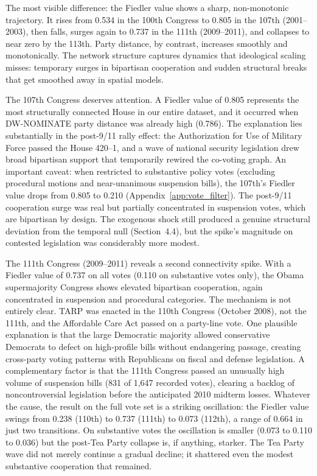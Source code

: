 \documentclass[12pt, a4paper]{article}
\begin{document}
The most visible difference: the Fiedler value shows a sharp, non-monotonic trajectory. It rises from 0.534 in the 100th Congress to 0.805 in the 107th (2001--2003), then falls, surges again to 0.737 in the 111th (2009--2011), and collapses to near zero by the 113th. Party distance, by contrast, increases smoothly and monotonically. The network structure captures dynamics that ideological scaling misses: temporary surges in bipartisan cooperation and sudden structural breaks that get smoothed away in spatial models.

The 107th Congress deserves attention. A Fiedler value of 0.805 represents the most structurally connected House in our entire dataset, and it occurred when DW-NOMINATE party distance was already high (0.786). The explanation lies substantially in the post-9/11 rally effect: the Authorization for Use of Military Force passed the House 420--1, and a wave of national security legislation drew broad bipartisan support that temporarily rewired the co-voting graph. An important caveat: when restricted to substantive policy votes (excluding procedural motions and near-unanimous suspension bills), the 107th's Fiedler value drops from 0.805 to 0.210 (Appendix~\ref{app:vote_filter}). The post-9/11 cooperation surge was real but partially concentrated in suspension votes, which are bipartisan by design. The exogenous shock still produced a genuine structural deviation from the temporal null (Section~4.4), but the spike's magnitude on contested legislation was considerably more modest.

The 111th Congress (2009--2011) reveals a second connectivity spike. With a Fiedler value of 0.737 on all votes (0.110 on substantive votes only), the Obama supermajority Congress shows elevated bipartisan cooperation, again concentrated in suspension and procedural categories. The mechanism is not entirely clear. TARP was enacted in the 110th Congress (October 2008), not the 111th, and the Affordable Care Act passed on a party-line vote. One plausible explanation is that the large Democratic majority allowed conservative Democrats to defect on high-profile bills without endangering passage, creating cross-party voting patterns with Republicans on fiscal and defense legislation. A complementary factor is that the 111th Congress passed an unusually high volume of suspension bills (831 of 1,647 recorded votes), clearing a backlog of noncontroversial legislation before the anticipated 2010 midterm losses. Whatever the cause, the result on the full vote set is a striking oscillation: the Fiedler value swings from 0.238 (110th) to 0.737 (111th) to 0.073 (112th), a range of 0.664 in just two transitions. On substantive votes the oscillation is smaller (0.073 to 0.110 to 0.036) but the post-Tea Party collapse is, if anything, starker. The Tea Party wave did not merely continue a gradual decline; it shattered even the modest substantive cooperation that remained.
\end{document}
